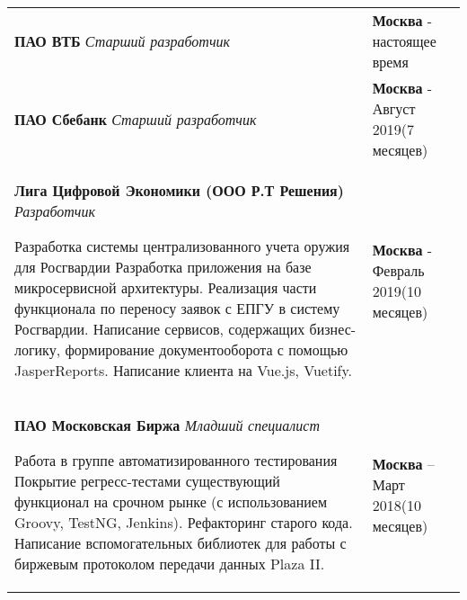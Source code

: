\documentclass{article}
\begin{document}
\begin{table}[h!]
\begin{center}

\def\arraystretch{1.7}%

\begin{tabular}
{ L{13cm} R{5cm} } \hhline{|=|=|}

\textbf{ПАО ВТБ}\newline
\emph{Старший разработчик}\newline

& \textbf{Москва} - настоящее время \\ 

\textbf{ПАО Сбебанк}\newline
\emph{Старший разработчик}\newline
& \textbf{Москва} - Август 2019\newline(7 месяцев) \\  

\textbf{Лига Цифровой Экономики (ООО Р.Т Решения)}\newline
\emph{Разработчик}\medskip

Разработка системы централизованного учета оружия для Росгвардии\newline
Разработка приложения на базе микросервисной архитектуры. Реализация части функционала по переносу заявок с ЕПГУ в систему Росгвардии. Написание сервисов, содержащих бизнес-логику, формирование документооборота с помощью JasperReports. Написание клиента на Vue.js, Vuetify.
& \textbf{Москва} - Февраль 2019\newline(10 месяцев) \\ 

\textbf{ПАО Московская Биржа}\newline
\emph{Младший специалист}\medskip

Работа в группе автоматизированного тестирования\newline
Покрытие регресс-тестами существующий функционал на срочном рынке (с использованием Groovy, TestNG, Jenkins). Рефакторинг старого кода. Написание вспомогательных библиотек для работы с биржевым протоколом передачи данных Plaza II.
& \textbf{Москва} – Март 2018\newline(10 месяцев) \\

\end{tabular}
\end{center}
\end{table}
\end{document}
